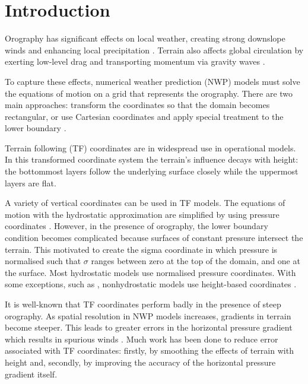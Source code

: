 \chapter{Introduction}

Orography has significant effects on local weather, creating strong downslope winds and enhancing local precipitation \autocite{barry2008}.  Terrain also affects global circulation by exerting low-level drag \autocite{lott-miller1997} and transporting momentum via gravity waves \autocite{mcfarlane1987}.

To capture these effects, numerical weather prediction (NWP) models must solve the equations of motion on a grid that represents the orography.
There are two main approaches: transform the coordinates so that the domain becomes rectangular, or use Cartesian coordinates and apply special treatment to the lower boundary \autocite{galchen-somerville1975}.

Terrain following (TF) coordinates are in widespread use in operational models.  In this transformed coordinate system the terrain's influence decays with height: the bottommost layers follow the underlying surface closely while the uppermost layers are flat.

A variety of vertical coordinates can be used in TF models.  The equations of motion with the hydrostatic approximation are simplified by using pressure coordinates \autocite{eliassen1949}.  However, in the presence of orography, the lower boundary condition becomes complicated because surfaces of constant pressure intersect the terrain.  This motivated \textcite{phillips1957} to create the sigma coordinate in which pressure is normalised such that $\sigma$ ranges between zero at the top of the domain, and one at the surface.
Most hydrostatic models use normalised pressure coordinates.  With some exceptions, such as \textcite{xue-thorpe1991}, nonhydrostatic models use height-based coordinates \autocite{steppeler2003}.

It is well-known that TF coordinates perform badly in the presence of steep orography.  As spatial resolution in NWP models increases, gradients in terrain become steeper.  This leads to greater errors in the horizontal pressure gradient which results in spurious winds \autocite{dempsey-davis1998}.    Much work has been done to reduce error associated with TF coordinates: firstly, by smoothing the effects of terrain with height and, secondly, by improving the accuracy of the horizontal pressure gradient itself.

